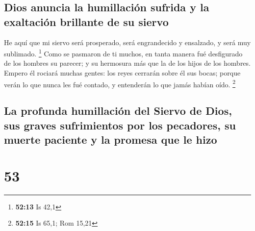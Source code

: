 \hypertarget{dios-anuncia-la-humillaciuxf3n-sufrida-y-la-exaltaciuxf3n-brillante-de-su-siervo}{%
\subsection{Dios anuncia la humillación sufrida y la exaltación
brillante de su
siervo}\label{dios-anuncia-la-humillaciuxf3n-sufrida-y-la-exaltaciuxf3n-brillante-de-su-siervo}}

 He aquí que mi siervo será prosperado, será engrandecido y
ensalzado, y será muy sublimado. \footnote{\textbf{52:13} Is 42,1}
 Como se pasmaron de ti muchos, en tanta manera fué
desfigurado de los hombres su parecer; y su hermosura más que la de los
hijos de los hombres.  Empero él rociará muchas gentes: los
reyes cerrarán sobre él sus bocas; porque verán lo que nunca les fué
contado, y entenderán lo que jamás habían oído. \footnote{\textbf{52:15}
  Is 65,1; Rom 15,21}

\hypertarget{la-profunda-humillaciuxf3n-del-siervo-de-dios-sus-graves-sufrimientos-por-los-pecadores-su-muerte-paciente-y-la-promesa-que-le-hizo}{%
\subsection{La profunda humillación del Siervo de Dios, sus graves
sufrimientos por los pecadores, su muerte paciente y la promesa que le
hizo}\label{la-profunda-humillaciuxf3n-del-siervo-de-dios-sus-graves-sufrimientos-por-los-pecadores-su-muerte-paciente-y-la-promesa-que-le-hizo}}

\hypertarget{section-52}{%
\section{53}\label{section-52}}

